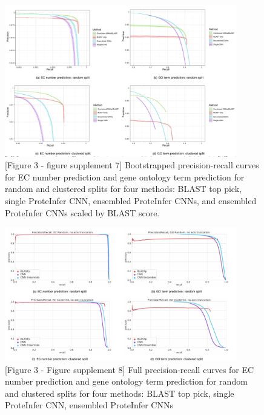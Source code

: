 \begin{figure}[ht] 
  \includegraphics[width=0.9\textwidth]{combined_subfigs_b.pdf}
  \caption{ [Figure 3 - figure supplement 7] Bootstrapped precision-recall curves for EC number prediction and gene ontology term prediction for random and clustered splits for four methods: BLAST top pick, single ProteInfer CNN, ensembled ProteInfer CNNs, and ensembled ProteInfer CNNs scaled by BLAST score. }
  \label{sup:fig:with_ensemble} 
\end{figure}



\begin{figure}[ht] 
  \includegraphics[width=0.9\textwidth]{combined_subfigs_c.pdf}
  \caption{[Figure 3 - Figure supplement 8] Full precision-recall curves for EC number prediction and gene ontology term prediction for random and clustered splits for four methods: BLAST top pick, single ProteInfer CNN, ensembled ProteInfer CNNs }
  \label{sup:fig:without_ensemble} 
\end{figure}



